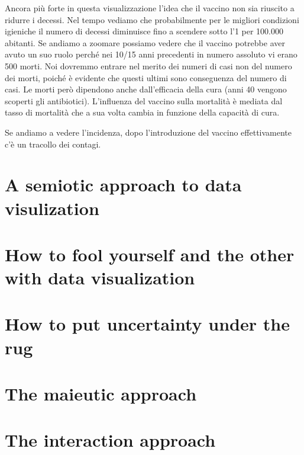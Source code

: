 \documentclass[12pt,a4paper]{report}
\begin{document}
Ancora più forte in questa visualizzazione l'idea che il vaccino non sia riuscito a ridurre i decessi. Nel tempo vediamo che probabilmente per le migliori condizioni igieniche il numero di decessi diminuisce fino a scendere sotto l'1 per 100.000 abitanti. Se andiamo a zoomare possiamo vedere che il vaccino potrebbe aver avuto un suo ruolo perché nei 10/15 anni precedenti in numero assoluto vi erano 500 morti. Noi dovremmo entrare nel merito dei numeri di casi non del numero dei morti, poiché è evidente che questi ultimi sono conseguenza del numero di casi. Le morti però dipendono anche dall'efficacia della cura (anni 40 vengono scoperti gli antibiotici). L'influenza del vaccino sulla mortalità è mediata dal tasso di mortalità che a sua volta cambia in funzione della capacità di cura. 

Se andiamo a vedere l'incidenza, dopo l'introduzione del vaccino effettivamente c'è un tracollo dei contagi. 


\chapter{A semiotic approach to data visulization}
\chapter{How to fool yourself and the other with data visualization}

\chapter{How to put uncertainty under the rug}
\chapter{The maieutic approach}
\chapter{The interaction approach} 
\end{document}
